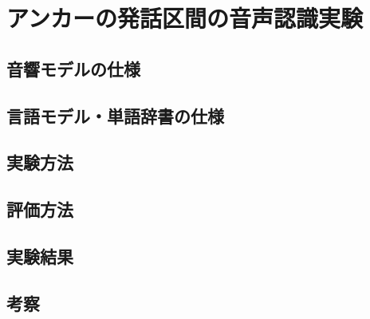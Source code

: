 \section{アンカーの発話区間の音声認識実験}
\subsection{音響モデルの仕様}
\subsection{言語モデル・単語辞書の仕様}
\subsection{実験方法}
\subsection{評価方法}
\subsection{実験結果}
\subsection{考察}
